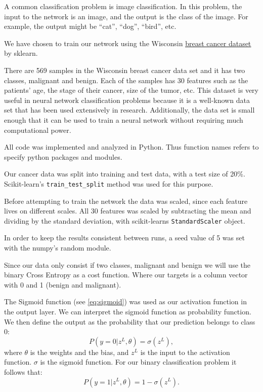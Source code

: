 A common classification problem is image classification. In
this problem, the input to the network is an image, and the output is the class
of the image. For example, the output might be “cat”, “dog”, “bird”, etc.

We have chosen to train our network using the Wisconsin 
\href{https://scikit-learn.org/stable/modules/generated/sklearn.datasets.load\_breast\_cancer.html?fbclid=IwAR0RNzOImikVXi41ecb14u\_qvUDybyIII43e9ySk0GEjyYWyPzybmmHeQWs}{\underline{breast
cancer dataset}} by sklearn.

There are 569 samples in the Wisconsin breast cancer data set and it has two
classes, malignant and benign. Each of the samples has 30 features such as the
patients’ age, the stage of their cancer, size of the tumor, etc. This dataset
is very useful in neural network classification problems because it is a well-known
data set that has been used extensively in research. Additionally, the data set
is small enough that it can be used to train a neural network without requiring
much computational power.





All code was implemented and analyzed in Python. Thus function names refers to
specify python packages and modules.  

Our cancer data was split into training and test data, with a test size of
20\%. 
Scikit-learn's \verb|train_test_split| method was used for this purpose. 


Before attempting to train the network the data was scaled, since each
feature lives on different scales. All 30 features was scaled by subtracting
the mean and dividing by the standard deviation, with scikit-learns
\verb|StandardScaler| object. 

In order to keep the results consistent between runs, a seed value of 5 was set
with the numpy's random module. 


Since our data only consist if two classes, malignant and benign we will use
the binary Cross Entropy as a cost function. Where our targets is a column vector
with 0 and 1 (benign and malignant). %



The Sigmoid function (see \eqref{eq:sigmoid}) was used as our activation
function in the output layer.
We can interpret the sigmoid function as probability function. 
We then define the output as the probability that our prediction belongs to
class 0: 
\begin{equation*}
    P(y = 0 | z^L, \theta ) = \sigma (z^L),
\end{equation*}
where $\theta $ is the weights and the bias, and $z^L$  is the input to the
activation function. $\sigma $ is the sigmoid function. 
For our binary classification problem it follows that: 
\begin{equation*}
    P(y = 1 | z^L, \theta ) = 1 - \sigma (z^L).
\end{equation*}


